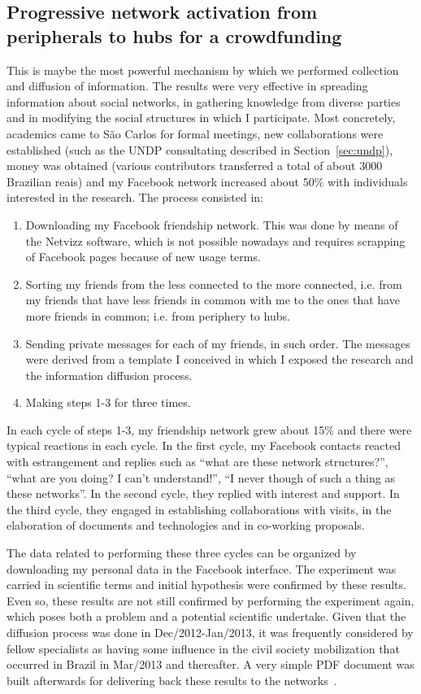 \begin{apendicesenv}
\subsection{Progressive network activation from peripherals to hubs for a crowdfunding}
This is maybe the most powerful mechanism by which we performed collection and diffusion of information.
The results were very effective in spreading information about social networks,
in gathering knowledge from diverse parties and in modifying the social structures
in which I participate.
Most concretely, academics came to São Carlos for formal meetings,
new collaborations were established (such as the UNDP consultating described in Section~\ref{sec:undp}),
money was obtained (various contributors transferred a total of about 3000 Brazilian reais)
and my Facebook network increased about 50\% with individuals interested in the research.
The process consisted in:
\begin{enumerate}
	\item Downloading my Facebook friendship network. This was done by means of the Netvizz software,
		which is not possible nowadays and requires scrapping of Facebook pages because of new usage terms.
	\item Sorting my friends from the less connected to the more connected, i.e. from my friends that have less friends in common with me to the ones that have more friends in common; i.e. from periphery to hubs.
	\item Sending private messages for each of my friends, in such order.
		The messages were derived from a template I conceived in which I exposed the research and the information diffusion process.
	\item Making steps 1-3 for three times.
\end{enumerate}
In each cycle of steps 1-3, my friendship network grew about 15\% and there were typical reactions in each cycle.
In the first cycle, my Facebook contacts reacted with estrangement and replies such as ``what are these network structures?'',
``what are you doing? I can't understand!'', ``I never though of such a thing as these networks''.
In the second cycle, they replied with interest and support.
In the third cycle, they engaged in establishing collaborations with visits, in the elaboration of documents and technologies and
in co-working proposals.

The data related to performing these three cycles can be organized by downloading my personal data in the Facebook interface.
The experiment was carried in scientific terms and initial hypothesis were confirmed by these results.
Even so, these results are not still confirmed by performing the experiment again,
which poses both a problem and a potential scientific undertake.
Given that the diffusion process was done in Dec/2012-Jan/2013, it was frequently considered by fellow specialists as
having some influence in the civil society mobilization that occurred in Brazil in Mar/2013 and thereafter.
A very simple PDF document was built afterwards for delivering back these results to the networks~\cite{docDif}.


\end{apendicesenv}
